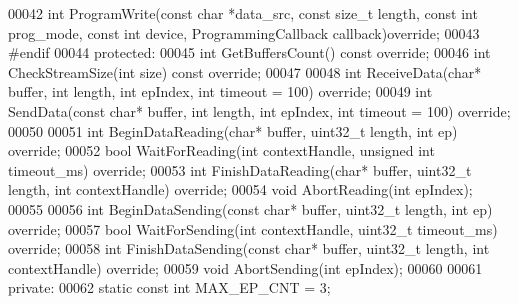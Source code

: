 \begin{DoxyCode}
00042     \textcolor{keywordtype}{int} ProgramWrite(\textcolor{keyword}{const} \textcolor{keywordtype}{char} *data\_src, \textcolor{keyword}{const} \textcolor{keywordtype}{size\_t} length, \textcolor{keyword}{const} \textcolor{keywordtype}{int} prog\_mode, \textcolor{keyword}{const} \textcolor{keywordtype}{int} 
      device, ProgrammingCallback callback)\textcolor{keyword}{override};
00043 \textcolor{preprocessor}{#endif}
00044 \textcolor{keyword}{protected}:
00045     \textcolor{keywordtype}{int} GetBuffersCount() \textcolor{keyword}{const override};
00046     \textcolor{keywordtype}{int} CheckStreamSize(\textcolor{keywordtype}{int} size) \textcolor{keyword}{const override};
00047     
00048     \textcolor{keywordtype}{int} ReceiveData(\textcolor{keywordtype}{char}* buffer, \textcolor{keywordtype}{int} length, \textcolor{keywordtype}{int} epIndex, \textcolor{keywordtype}{int} timeout = 100) \textcolor{keyword}{override};
00049     \textcolor{keywordtype}{int} SendData(\textcolor{keyword}{const} \textcolor{keywordtype}{char}* buffer, \textcolor{keywordtype}{int} length, \textcolor{keywordtype}{int} epIndex, \textcolor{keywordtype}{int} timeout = 100) \textcolor{keyword}{override};
00050     
00051     \textcolor{keywordtype}{int} BeginDataReading(\textcolor{keywordtype}{char}* buffer, uint32\_t length, \textcolor{keywordtype}{int} ep) \textcolor{keyword}{override};
00052     \textcolor{keywordtype}{bool} WaitForReading(\textcolor{keywordtype}{int} contextHandle, \textcolor{keywordtype}{unsigned} \textcolor{keywordtype}{int} timeout_ms) \textcolor{keyword}{override};
00053     \textcolor{keywordtype}{int} FinishDataReading(\textcolor{keywordtype}{char}* buffer, uint32\_t length, \textcolor{keywordtype}{int} contextHandle) \textcolor{keyword}{override};
00054     \textcolor{keywordtype}{void} AbortReading(\textcolor{keywordtype}{int} epIndex);
00055 
00056     \textcolor{keywordtype}{int} BeginDataSending(\textcolor{keyword}{const} \textcolor{keywordtype}{char}* buffer, uint32\_t length, \textcolor{keywordtype}{int} ep) \textcolor{keyword}{override};
00057     \textcolor{keywordtype}{bool} WaitForSending(\textcolor{keywordtype}{int} contextHandle, uint32\_t timeout\_ms) \textcolor{keyword}{override};
00058     \textcolor{keywordtype}{int} FinishDataSending(\textcolor{keyword}{const} \textcolor{keywordtype}{char}* buffer, uint32\_t length, \textcolor{keywordtype}{int} contextHandle) \textcolor{keyword}{override};
00059     \textcolor{keywordtype}{void} AbortSending(\textcolor{keywordtype}{int} epIndex);
00060 
00061 \textcolor{keyword}{private}:
00062     \textcolor{keyword}{static} \textcolor{keyword}{const} \textcolor{keywordtype}{int} MAX_EP_CNT = 3;

\end{DoxyCode}
